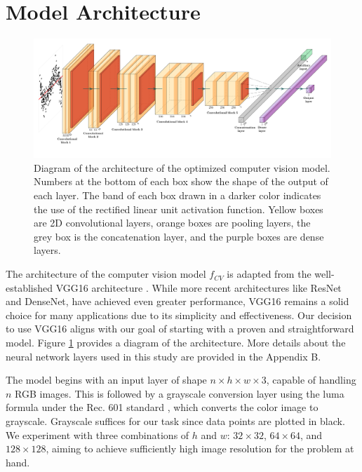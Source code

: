 \documentclass[]{interact}
\theoremstyle{plain}%
\theoremstyle{definition}
\theoremstyle{remark}
\begin{document}
\section{Model Architecture}\label{sec-model-architecture}

\begin{figure}[!h]

{\centering \includegraphics[width=1\linewidth]{paper_files/figure-latex/cnn-diag-1} 

}

\caption{Diagram of the architecture of the optimized computer vision model. Numbers at the bottom of each box show the shape of the output of each layer. The band of each box drawn in a darker color indicates the use of the rectified linear unit activation function.  Yellow boxes are 2D convolutional layers, orange boxes are pooling layers, the grey box is the concatenation layer, and the purple boxes are dense layers.}\label{fig:cnn-diag}
\end{figure}

The architecture of the computer vision model \(f_{CV}\) is adapted from
the well-established VGG16 architecture \citep{simonyan2014very}. While
more recent architectures like ResNet \citep{he2016deep} and
DenseNet\citep{huang2017densely}, have achieved even greater
performance, VGG16 remains a solid choice for many applications due to
its simplicity and effectiveness. Our decision to use VGG16 aligns with
our goal of starting with a proven and straightforward model. Figure
\ref{fig:cnn-diag} provides a diagram of the architecture. More details
about the neural network layers used in this study are provided in the
Appendix B.

The model begins with an input layer of shape
\(n \times h \times w \times 3\), capable of handling \(n\) RGB images.
This is followed by a grayscale conversion layer using the luma formula
under the Rec. 601 standard \citep{series2011studio}, which converts the
color image to grayscale. Grayscale suffices for our task since data
points are plotted in black. We experiment with three combinations of
\(h\) and \(w\): \(32 \times 32\), \(64 \times 64\), and
\(128 \times 128\), aiming to achieve sufficiently high image resolution
for the problem at hand.
\end{document}
